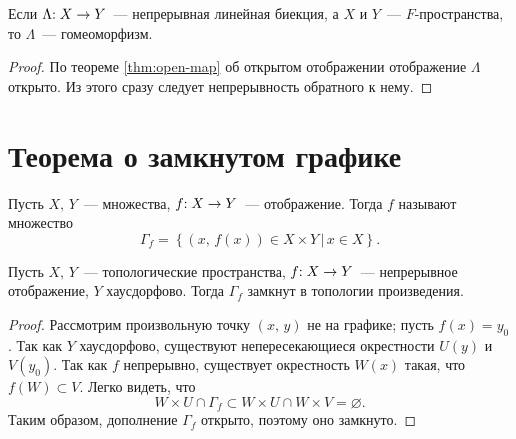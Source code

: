 \documentclass{notes}
\begin{document}
	\begin{cor}\label{cor:ban}
		Если $\Lambda\text{\text{:}} \; X \to Y$~--- непрерывная линейная биекция, а $X$ и $Y$~--- $F$-пространства, то $\Lambda$~--- гомеоморфизм.
		\begin{proof}
			По теореме \ref{thm:open-map} об открытом отображении отображение $\Lambda$ открыто. Из этого сразу следует непрерывность обратного к нему.
		\end{proof}
	\end{cor}

\section{Теорема о замкнутом графике}

	\begin{de}
		Пусть $X, \, Y$~--- множества, $f\text{\text{:}}\; X \to Y$~--- отображение. Тогда  $f$ называют множество
		\[
			\Gamma_f = \left\{(x, \, f(x)) \in X \times Y \, \big |\, x \in X\right\}.
		\]
	\end{de}

	\begin{st}
		Пусть $X, \, Y$~--- топологические пространства, $f\text{\text{:}}\; X \to Y$~--- непрерывное отображение, $Y$ хаусдорфово. Тогда $\Gamma_f$ замкнут в топологии произведения.
		\begin{proof}
			Рассмотрим произвольную точку $(x, \, y)$ не на графике; пусть $f(x) = y_0$. Так как $Y$ хаусдорфово, существуют непересекающиеся окрестности $U(y)$ и $V(y_0)$. Так как $f$ непрерывно, существует окрестность $W(x)$ такая, что $f(W) \subset V$. Легко видеть, что
			\[
				W \times U \cap \Gamma_f \subset W \times U \cap W \times V = \varnothing.
			\]
			Таким образом, дополнение $\Gamma_f$ открыто, поэтому оно замкнуто.
		\end{proof}
	\end{st}
\end{document}
